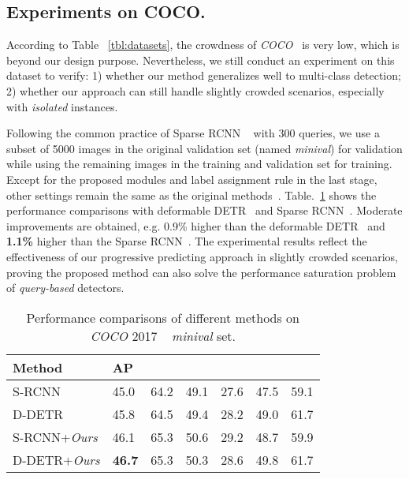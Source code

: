 \documentclass[final]{cvpr}
\begin{document}
\vspace{-0.2cm}
\subsection{Experiments on COCO.}
According to Table ~\ref{tbl:datasets}, the crowdness of \emph{COCO}~\cite{lin2014microsoft} is
very low, which is beyond our design purpose. Nevertheless, we still conduct an experiment on this dataset to verify: 1) whether our method generalizes well to multi-class detection; 2) whether our approach can still handle slightly crowded scenarios, especially with \emph{isolated} instances.

Following the common practice of Sparse RCNN ~\cite{sun2020sparse} with 300 queries, we use a subset of 5000 images in the original validation set (named \emph{minival}) for validation while using the remaining images in the training and validation set for training. Except for the proposed modules and label assignment rule in the last stage, other settings remain the same as the original methods~\cite{zhu2021deformable, sun2020sparse}. Table.~\ref{tbl:mscoco_eval} shows the performance comparisons with deformable DETR~\cite{zhu2021deformable} and Sparse RCNN~\cite{sun2020sparse}. Moderate improvements are obtained, e.g. \textbf{}{0.9\%}  higher than the deformable DETR~\cite{zhu2021deformable} and \textbf{1.1\%}  higher than the Sparse RCNN~\cite{sun2020sparse}. The experimental results reflect the effectiveness of our progressive predicting approach in slightly crowded scenarios, proving the proposed method can also solve the performance saturation problem of \emph{query-based} detectors.

\begin{table}[t]
  \centering
  \begin{tabular}{p{23mm}|p{5mm}<{\centering}p{5mm}<{\centering}p{6mm}<{\centering}|p{5mm}<{\centering}p{5mm}<{\centering}p{5mm}<{\centering}}
  \toprule
  Method & AP &  &  &   &   & \\
  \hline
  S-RCNN~\cite{sun2020sparse} & 45.0 & 64.2 & 49.1 & 27.6 & 47.5 & 59.1 \\
  D-DETR~\cite{zhu2021deformable} & 45.8 & 64.5 & 49.4 & 28.2 & 49.0 & 61.7 \\
  \hline
  S-RCNN+\emph{Ours} & 46.1 & 65.3 & 50.6 & 29.2  &  48.7  & 59.9 \\
  D-DETR+\emph{Ours} &  \textbf{46.7} & 65.3 & 50.3 & 28.6  &  49.8  & 61.7 \\
  \bottomrule
  \end{tabular}
  \caption{Performance comparisons of different methods on \emph{COCO} 2017 ~\cite{lin2014microsoft} \emph{minival} set.}
  \label{tbl:mscoco_eval}
 \vspace{-1pt}
\end{table}
\end{document}
